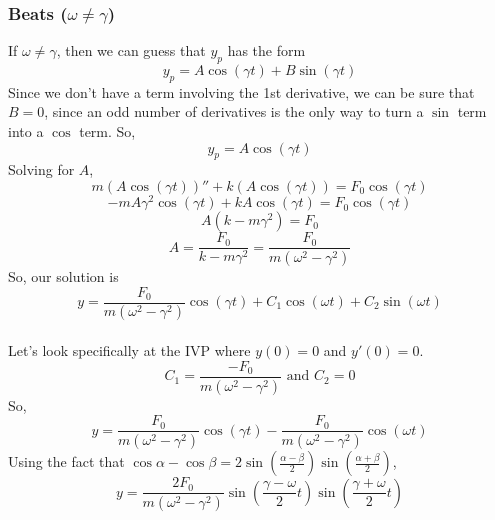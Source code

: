 \subsubsection{Beats ($\omega \neq \gamma$)}
\noindent
If $\omega \neq \gamma$, then we can guess that $y_p$ has the form
\begin{equation*}
	y_p = A\cos{(\gamma t)} + B\sin{(\gamma t)}
\end{equation*}
Since we don't have a term involving the 1st derivative, we can be sure that $B = 0$, since an odd number of derivatives is the only way to turn a $\sin$ term into a $\cos$ term. So,
\begin{equation*}
	y_p = A\cos{(\gamma t)}
\end{equation*}
Solving for $A$,
\begin{equation*}
	m\left(A\cos{(\gamma t)}\right)'' + k\left(A\cos{(\gamma t)}\right) = F_0\cos{(\gamma t)}
\end{equation*}
\begin{equation*}
	-mA\gamma^2\cos{(\gamma t)} + kA\cos{(\gamma t)} = F_0\cos{(\gamma t)}
\end{equation*}
\begin{equation*}
	A\left(k - m\gamma^2\right) = F_0
\end{equation*}
\begin{equation*}
	A = \frac{F_0}{k - m\gamma^2} = \frac{F_0}{m(\omega^2 - \gamma^2)}
\end{equation*}
So, our solution is
\begin{equation*}
	y = \frac{F_0}{m(\omega^2 - \gamma^2)}\cos{(\gamma t)} + C_1\cos{(\omega t)} + C_2\sin{(\omega t)}
\end{equation*}\\

\noindent
Let's look specifically at the IVP where $y(0) = 0$ and $y'(0) = 0$.
\begin{equation*}
	C_1 = \frac{-F_0}{m(\omega^2 - \gamma^2)} \text{ and } C_2 = 0
\end{equation*}
So,
\begin{equation*}
	y = \frac{F_0}{m(\omega^2 - \gamma^2)}\cos{(\gamma t)} - \frac{F_0}{m(\omega^2 - \gamma^2)}\cos{(\omega t)}
\end{equation*}
Using the fact that $\cos{\alpha}-\cos{\beta} = 2\sin{\left(\frac{\alpha - \beta}{2}\right)}\sin{\left(\frac{\alpha + \beta}{2}\right)}$,
\begin{equation*}
	y = \frac{2F_0}{m(\omega^2 - \gamma^2)}\sin{\left(\frac{\gamma - \omega}{2}t\right)}\sin{\left(\frac{\gamma + \omega}{2}t\right)}
\end{equation*}\\


